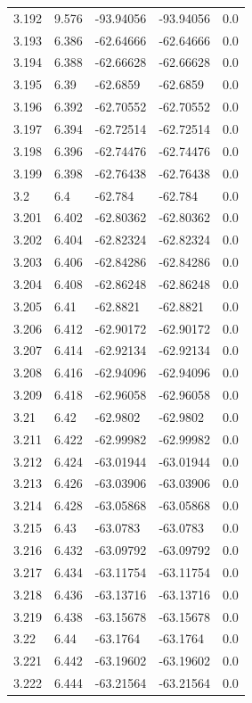 \begin{tabular}{lllll}
3.192 & 9.576 & -93.94056 & -93.94056 & 0.0 \\
3.193 & 6.386 & -62.64666 & -62.64666 & 0.0 \\
3.194 & 6.388 & -62.66628 & -62.66628 & 0.0 \\
3.195 & 6.39 & -62.6859 & -62.6859 & 0.0 \\
3.196 & 6.392 & -62.70552 & -62.70552 & 0.0 \\
3.197 & 6.394 & -62.72514 & -62.72514 & 0.0 \\
3.198 & 6.396 & -62.74476 & -62.74476 & 0.0 \\
3.199 & 6.398 & -62.76438 & -62.76438 & 0.0 \\
3.2 & 6.4 & -62.784 & -62.784 & 0.0 \\
3.201 & 6.402 & -62.80362 & -62.80362 & 0.0 \\
3.202 & 6.404 & -62.82324 & -62.82324 & 0.0 \\
3.203 & 6.406 & -62.84286 & -62.84286 & 0.0 \\
3.204 & 6.408 & -62.86248 & -62.86248 & 0.0 \\
3.205 & 6.41 & -62.8821 & -62.8821 & 0.0 \\
3.206 & 6.412 & -62.90172 & -62.90172 & 0.0 \\
3.207 & 6.414 & -62.92134 & -62.92134 & 0.0 \\
3.208 & 6.416 & -62.94096 & -62.94096 & 0.0 \\
3.209 & 6.418 & -62.96058 & -62.96058 & 0.0 \\
3.21 & 6.42 & -62.9802 & -62.9802 & 0.0 \\
3.211 & 6.422 & -62.99982 & -62.99982 & 0.0 \\
3.212 & 6.424 & -63.01944 & -63.01944 & 0.0 \\
3.213 & 6.426 & -63.03906 & -63.03906 & 0.0 \\
3.214 & 6.428 & -63.05868 & -63.05868 & 0.0 \\
3.215 & 6.43 & -63.0783 & -63.0783 & 0.0 \\
3.216 & 6.432 & -63.09792 & -63.09792 & 0.0 \\
3.217 & 6.434 & -63.11754 & -63.11754 & 0.0 \\
3.218 & 6.436 & -63.13716 & -63.13716 & 0.0 \\
3.219 & 6.438 & -63.15678 & -63.15678 & 0.0 \\
3.22 & 6.44 & -63.1764 & -63.1764 & 0.0 \\
3.221 & 6.442 & -63.19602 & -63.19602 & 0.0 \\
3.222 & 6.444 & -63.21564 & -63.21564 & 0.0 \\

\end{tabular}
